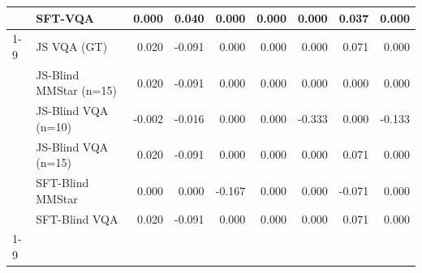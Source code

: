\begin{tabular}{llrrrrrrr}
 & SFT-VQA & 0.000 & 0.040 & 0.000 & 0.000 & 0.000 & 0.037 & 0.000 \\
\cline{1-9}
\multirow[t]{6}{*}{Qwen3‑VL (8B)} & JS VQA (GT) & 0.020 & -0.091 & 0.000 & 0.000 & 0.000 & 0.071 & 0.000 \\
 & JS-Blind MMStar (n=15) & 0.020 & -0.091 & 0.000 & 0.000 & 0.000 & 0.000 & 0.000 \\
 & JS-Blind VQA (n=10) & -0.002 & -0.016 & 0.000 & 0.000 & -0.333 & 0.000 & -0.133 \\
 & JS-Blind VQA (n=15) & 0.020 & -0.091 & 0.000 & 0.000 & 0.000 & 0.071 & 0.000 \\
 & SFT-Blind MMStar & 0.000 & 0.000 & -0.167 & 0.000 & 0.000 & -0.071 & 0.000 \\
 & SFT-Blind VQA & 0.020 & -0.091 & 0.000 & 0.000 & 0.000 & 0.071 & 0.000 \\
\cline{1-9}
\bottomrule
\end{tabular}
